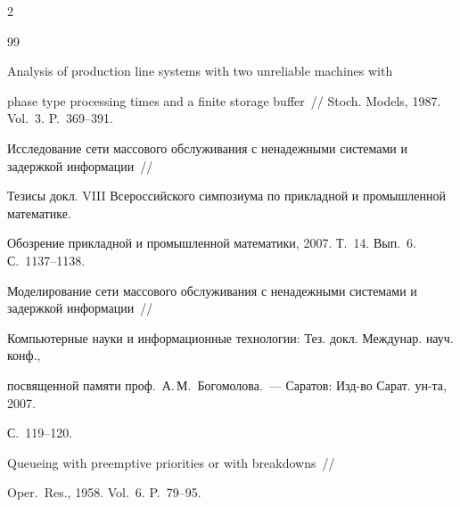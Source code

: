 \begin{multicols}{2}
{{\begin{thebibliography}{99}




Analysis of production line systems with two unreliable machines with


phase type processing times and a finite storage buffer~// Stoch. Models, 1987. Vol.~3. P.~369--391.












Исследование сети массового обслуживания с ненадежными системами и задержкой информации~//


Тезисы докл. VIII Всероссийского симпозиума по прикладной и промышленной математике.


Обозрение прикладной и промышленной математики, 2007. Т.~14. Вып.~6. С.~1137--1138.









Моделирование сети массового обслуживания с ненадежными системами и задержкой информации~//


Компьютерные науки и информационные технологии: Тез. докл. Междунар. науч. конф.,


посвященной памяти проф.\ А.\,М.~Богомолова.~--- Саратов: Изд-во Сарат. ун-та, 2007.\linebreak


С.~119--120.














Queueing with preemptive priorities or with breakdowns~//


Oper.\ Res., 1958. Vol.~6. P.~79--95.










\end{thebibliography}}}
\end{multicols}
